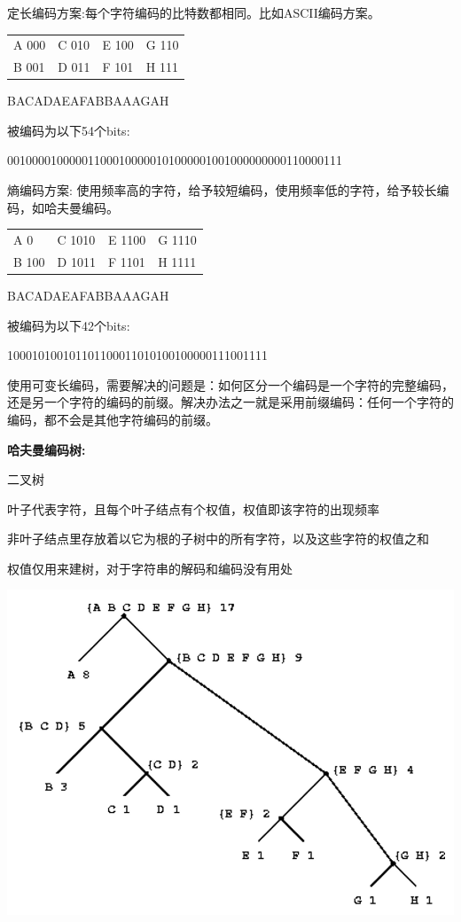 \documentclass[10pt,UTF8,a4paper]{ctexart}
\begin{document}
\begin{multicols}{3}
定长编码方案:每个字符编码的比特数都相同。比如ASCII编码方案。

\begin{tabular}{llll}
	A 000&	C 010  &	E 100	&G 110	\\
	B 001&	D 011	&F 101	&H 111
\end{tabular}

BACADAEAFABBAAAGAH

被编码为以下54个bits:

001000010000011000100000101000001001000000000110000111


熵编码方案: 使用频率高的字符，给予较短编码，使用频率低的字符，给予较长编码，如哈夫曼编码。

\begin{tabular}{llll}
	A 0	&C 1010	&  E 1100	&   G 1110		\\
	B 100&	D 1011	 & F 1101	&    H 1111
\end{tabular}

BACADAEAFABBAAAGAH

被编码为以下42个bits:

100010100101101100011010100100000111001111

使用可变长编码，需要解决的问题是：如何区分一个编码是一个字符的完整编码，还是另一个字符的编码的前缀。解决办法之一就是采用前缀编码：任何一个字符的编码，都不会是其他字符编码的前缀。

\textbf{哈夫曼编码树:}

二叉树

叶子代表字符，且每个叶子结点有个权值，权值即该字符的出现频率

非叶子结点里存放着以它为根的子树中的所有字符，以及这些字符的权值之和

权值仅用来建树，对于字符串的解码和编码没有用处

\includegraphics[width=\columnwidth]{images/哈夫曼编码树.png}


\end{multicols}
\end{document}
